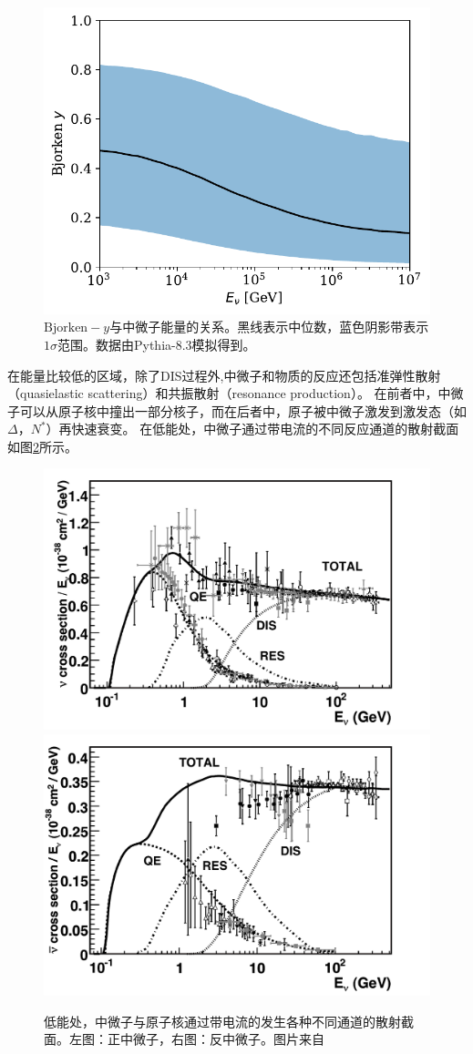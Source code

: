 \begin{figure}[htb]
    \centering
    \includegraphics[width=0.7\linewidth]{img/Bjorken_y.pdf}
    \caption{$\mathrm{Bjorken}-y$与中微子能量的关系。黑线表示中位数，蓝色阴影带表示$1\sigma$范围。数据由Pythia-8.3\cite{Pythia8.2:2014, Pythia8.3:2022}模拟得到。}
    \label{fig:Bjorken_y}
\end{figure}

在能量比较低的区域，除了DIS过程外,中微子和物质的反应还包括准弹性散射（quasielastic scattering）和共振散射（resonance  production）。
在前者中，中微子可以从原子核中撞出一部分核子，而在后者中，原子被中微子激发到激发态（如$\Delta$，$N^*$）再快速衰变\cite{CS_Formaggio:2012}。
在低能处，中微子通过带电流的不同反应通道的散射截面如图\ref{fig:DIS_cross_section_le}所示。

\begin{figure}[htb]
    \centering
    \includegraphics[width=0.45\linewidth]{img/cross_section_le_CC.pdf}
    \includegraphics[width=0.45\linewidth]{img/cross_section_le_CCbar.pdf}
    \caption{低能处，中微子与原子核通过带电流的发生各种不同通道的散射截面。左图：正中微子，右图：反中微子。图片来自\cite{CS_Formaggio:2012}}
    \label{fig:DIS_cross_section_le}
\end{figure}




